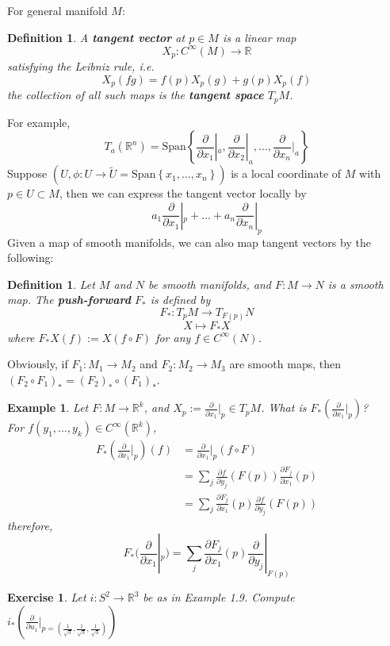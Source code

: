 \documentclass[11pt]{article}
\newtheorem{example}[theorem]{Example}
\newtheorem{exercise}[theorem]{Exercise}
\newtheorem{definition}[theorem]{Definition}
\newcommand{\bb}[1]{\mathbb{#1}}
\begin{document}
For general manifold $M$:
\begin{definition}
A \textbf{tangent vector} at $p \in M$ is a linear map
$$X_p : C^{\infty}(M) \to \bb{R}$$
satisfying the Leibniz rule, i.e.
$$X_p(fg) = f(p)X_p(g) +g(p)X_p(f)$$
the collection of all such maps is the \textbf{tangent space} $T_pM$.
\end{definition}
For example,
$$T_a(\bb{R}^n) = \mathrm{Span}\left\{ \frac{\partial }{\partial x_1}|_a, \frac{\partial }{\partial x_2}|_a, \dots, \frac{\partial}{\partial x_n}|_a \right\}$$
Suppose $(U,\phi: U \to \tilde{U} = \mathrm{Span}\left\{x_1, \dots, x_n\right\})$ is a local coordinate of $M$ with $p \in U \subset M$, then we can express the tangent vector locally by
$$a_1\frac{\partial }{\partial x_1}|_p +  \dots +  a_n \frac{\partial }{\partial x_n}|_p$$
Given a map of smooth manifolds, we can also map tangent vectors by the following:
\begin{definition}
Let $M$ and $N$ be smooth manifolds, and $F: M \to N$ is a smooth map. The \textbf{push-forward} $F_*$ is defined by
$$F_*: T_pM \to T_{F(p)}N$$
$$X \mapsto F_*X$$
where $F_*X(f) := X(f \circ F)$ for any $f \in C^{\infty}(N)$.
\end{definition}
Obviously, if $F_1 : M_1 \to M_2$ and $F_2: M_2 \to M_3$ are smooth maps, then $(F_2 \circ F_1)_* = (F_2)_* \circ (F_1)_*$.
\begin{example}
Let $F: M \to \bb{R}^k$, and $X_p := \frac{\partial }{\partial x_1}|_p \in T_pM$. What is $F_*(\frac{\partial }{\partial x_1}|_p)$?\\
For $f(y_1, \dots, y_k) \in C^{\infty}(\bb{R}^k)$,
\begin{align*}
F_*(\frac{\partial }{\partial x_1}|_p)(f) &= \frac{\partial }{\partial x_1}|_p(f \circ F) \\
&= \sum_j \frac{\partial f}{\partial y_j}(F(p)) \frac{\partial F_j}{\partial x_1}(p)\\
&= \sum_j \frac{\partial F_j}{\partial x_1}(p)\frac{\partial f}{\partial y_j}(F(p))
\end{align*}
therefore,
$$F_*(\frac{\partial }{\partial x_1}|_p) = \sum_j \frac{\partial F_j}{\partial x_1}(p)\frac{\partial }{\partial y_j}|_{F(p)}$$
\end{example}
\begin{exercise}
Let $i: S^2 \to \bb{R}^3$ be as in Example 1.9. Compute $i_*(\frac{\partial }{\partial u_1}|_{p = (\frac{1}{\sqrt{3}},\frac{1}{\sqrt{3}},\frac{1}{\sqrt{3}})})$
\end{exercise}
\end{document}
